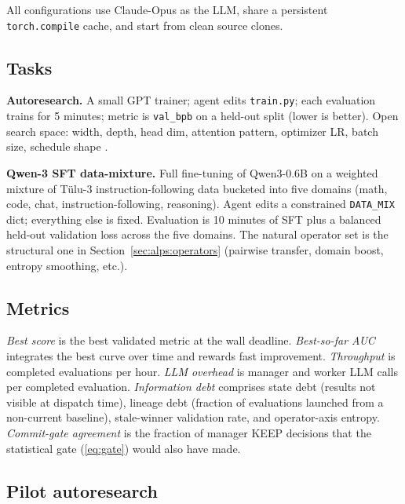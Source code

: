 \documentclass{article}
\begin{document}
All configurations use Claude-Opus as the LLM, share a persistent \texttt{torch.compile} cache, and start from clean source clones.

\subsection{Tasks}

\textbf{Autoresearch.} A small GPT trainer; agent edits \texttt{train.py}; each evaluation trains for 5 minutes; metric is \texttt{val\_bpb} on a held-out split (lower is better). Open search space: width, depth, head dim, attention pattern, optimizer LR, batch size, schedule shape \citep{karpathy_autoresearch}.

\textbf{Qwen-3 SFT data-mixture.} Full fine-tuning of Qwen3-0.6B \citep{qwen3} on a weighted mixture of T\"ulu-3 instruction-following data \citep{tulu3} bucketed into five domains (math, code, chat, instruction-following, reasoning). Agent edits a constrained \texttt{DATA\_MIX} dict; everything else is fixed. Evaluation is 10 minutes of SFT plus a balanced held-out validation loss across the five domains. The natural operator set is the structural one in Section~\ref{sec:alps:operators} (pairwise transfer, domain boost, entropy smoothing, etc.).

\subsection{Metrics}

\emph{Best score} is the best validated metric at the wall deadline. \emph{Best-so-far AUC} integrates the best curve over time and rewards fast improvement. \emph{Throughput} is completed evaluations per hour. \emph{LLM overhead} is manager and worker LLM calls per completed evaluation. \emph{Information debt} comprises state debt (results not visible at dispatch time), lineage debt (fraction of evaluations launched from a non-current baseline), stale-winner validation rate, and operator-axis entropy. \emph{Commit-gate agreement} is the fraction of manager KEEP decisions that the statistical gate (\ref{eq:gate}) would also have made.

\subsection{Pilot autoresearch}
\label{sec:experiments:auto}
\end{document}
